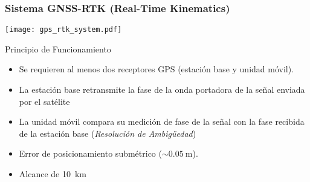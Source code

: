 \begin{frame}

\end{frame}

\begin{frame}
    \frametitle{Sistema GNSS-RTK (Real-Time Kinematics)}
    \begin{center}
        \texttt{[image: gps\_rtk\_system.pdf]}
    \end{center}
    
    \begin{block}{Principio de Funcionamiento}
        \begin{itemize}
            \item Se requieren al menos dos receptores GPS (estación base y unidad móvil). 
            \item La estación base retransmite la fase de la onda portadora de la señal enviada por el satélite 
            \item La unidad móvil compara su medición de fase de la señal con la fase recibida de la estación base (\emph{Resolución de Ambig{\"u}edad})
        \end{itemize}
    \end{block}
 
    \begin{itemize}
        \item Error de posicionamiento submétrico ($\sim\SI{0.05}{\meter}$).
        \item Alcance de \SI{10}{\km}
    \end{itemize}


\end{frame}
